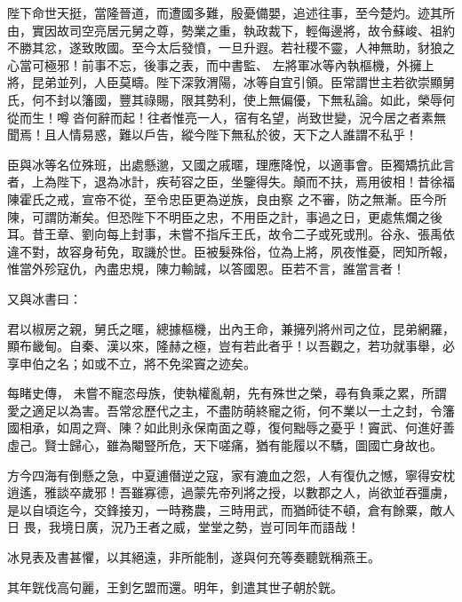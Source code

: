 \begin{pinyinscope}
 陛下命世天挺，當隆晉道，而遭國多難，殷憂備嬰，追述往事，至今楚灼。迹其所由，實因故司空亮居元舅之尊，勢業之重，執政裁下，輕侮邊將，故令蘇峻、祖約不勝其忿，遂致敗國。至今太后發憤，一旦升遐。若社稷不靈，人神無助，豺狼之心當可極邪！前事不忘，後事之表，而中書監、
 左將軍冰等內執樞機，外擁上將，昆弟並列，人臣莫疇。陛下深敦渭陽，冰等自宜引領。臣常謂世主若欲崇顯舅氏，何不封以籓國，豐其祿賜，限其勢利，使上無偏優，下無私論。如此，榮辱何從而生！噂沓何辭而起！往者惟亮一人，宿有名望，尚致世變，況今居之者素無聞焉！且人情易惑，難以戶告，縱今陛下無私於彼，天下之人誰謂不私乎！



 臣與冰等名位殊班，出處懸邈，又國之戚暱，理應降悅，以適事會。臣獨矯抗此言者，上為陛下，退為冰計，疾茍容之臣，坐鑒得失。顛而不扶，焉用彼相！昔徐福陳霍氏之戒，宣帝不從，至令忠臣更為逆族，良由察
 之不審，防之無漸。臣今所陳，可謂防漸矣。但恐陛下不明臣之忠，不用臣之計，事過之日，更處焦爛之後耳。昔王章、劉向每上封事，未嘗不指斥王氏，故令二子或死或刑。谷永、張禹依違不對，故容身茍免，取譏於世。臣被髮殊俗，位為上將，夙夜惟憂，罔知所報，惟當外殄寇仇，內盡忠規，陳力輸誠，以答國恩。臣若不言，誰當言者！



 又與冰書曰：



 君以椒房之親，舅氏之暱，總據樞機，出內王命，兼擁列將州司之位，昆弟網羅，顯布畿甸。自秦、漢以來，隆赫之極，豈有若此者乎！以吾觀之，若功就事舉，必享申伯之名；如或不立，將不免梁竇之迹矣。



 每睹史傳，
 未嘗不寵恣母族，使執權亂朝，先有殊世之榮，尋有負乘之累，所謂愛之適足以為害。吾常忿歷代之主，不盡防萌終寵之術，何不業以一土之封，令籓國相承，如周之齊、陳？如此則永保南面之尊，復何黜辱之憂乎！竇武、何進好善虛己。賢士歸心，雖為閹豎所危，天下嗟痛，猶有能履以不驕，圖國亡身故也。



 方今四海有倒懸之急，中夏逋僭逆之寇，家有漉血之怨，人有復仇之憾，寧得安枕逍遙，雅談卒歲邪！吾雖寡德，過蒙先帝列將之授，以數郡之人，尚欲並吞彊虜，是以自頃迄今，交鋒接刃，一時務農，三時用武，而猶師徒不頓，倉有餘粟，敵人日
 畏，我境日廣，況乃王者之威，堂堂之勢，豈可同年而語哉！



 冰見表及書甚懼，以其絕遠，非所能制，遂與何充等奏聽皝稱燕王。



 其年皝伐高句麗，王釗乞盟而還。明年，釗遣其世子朝於皝。




\end{pinyinscope}
